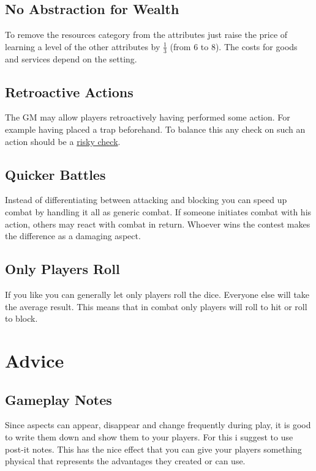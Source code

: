 \documentclass[11pt]{article}
\begin{document}
{\subsection{No Abstraction for Wealth}
\label{sec:org7fc0256}

To remove the resources category from the attributes just raise the price of learning a level of the other attributes by \(\frac{1}{3}\) (from 6 to 8). The costs for goods and services
depend on the setting.
\subsection{Retroactive Actions}
\label{sec:org3c4c581}

The GM may allow players retroactively having performed some action. For example having placed a trap beforehand. To balance this any check on such an action should be a \hyperref[sec:orgfc629d3]{risky check}.
\subsection{Quicker Battles}
\label{sec:org2a752a3}

Instead of differentiating between attacking and blocking you can speed up combat by handling it all as generic combat. If someone initiates combat with his action, others may react with combat in return. Whoever wins the contest makes the difference as a damaging aspect.
\subsection{Only Players Roll}
\label{sec:org9c5b31a}
If you like you can generally let only players roll the dice. Everyone else will take the average result. This means that in combat only players will roll to hit or roll to block.
\section{Advice}
\label{sec:orgb62fd64}
\subsection{Gameplay Notes}
\label{sec:org023ee2d}

Since aspects can appear, disappear and change frequently during play, it is good to write them down and show them to your players. For this i suggest to use post-it notes. This has the nice effect that you can give your players something physical that represents the advantages they created or can use.
}
\end{document}

